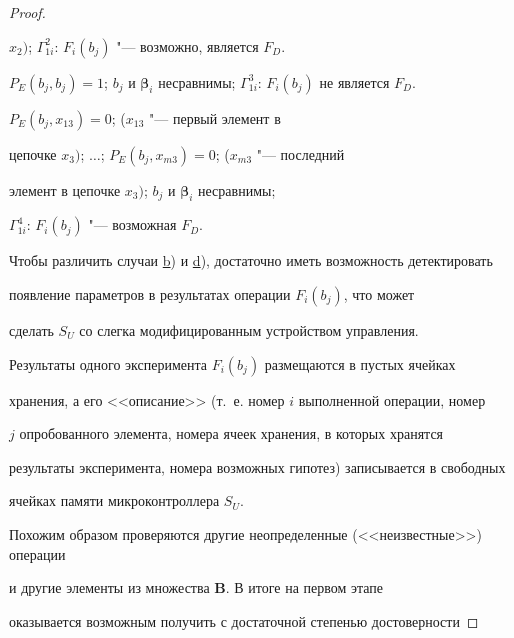 \begin{proof}
\begin{description}
$x_{2})$; $\Gamma ^{2}_{1i}$: $F_{i}(b_{j})$ "--- возможно, является $F_{D}$.



\item[Для случая \hyperlink{kr:c}{c}):] $P_{E}(b_{j}, b_{j}) = 1$; $b_{j}$ и $\boldsymbol{\beta}

_{i}$ несравнимы; $\Gamma ^{3}_{1i}$: $F_{i}(b_{j})$ не является $F_{D}$.



\item[Для случая \hyperlink{kr:d}{d}):] $P_{E}(b_{j}, x_{13}) = 0$; ($x_{13}$ "--- первый элемент в

цепочке $x_{3})$; $\ldots$; \linebreak $P_{E}(b_{j}, x_{m3})=0$; ($x_{m3}$ "--- последний

элемент в цепочке $x_{3})$; $b_{j}$ и $\boldsymbol{\beta}_{i}$ несравнимы;

$\Gamma ^{4}_{1i}$: $F_{i}(b_{j})$ "--- возможная $F_{D}$.







\end{description}



Чтобы различить случаи \hyperlink{kr:b}{b}) и \hyperlink{kr:d}{d}), достаточно иметь возможность детектировать

появление параметров в результатах операции $F_{i}(b_{j})$, что может

сделать $S_{U}$ со слегка модифицированным устройством управления.



Результаты одного эксперимента $F_{i}(b_{j})$ размещаются в пустых ячейках

хранения, а его <<описание>> (т.~е. номер $i$ выполненной операции, номер

$j$ опробованного элемента, номера ячеек хранения, в которых хранятся

результаты эксперимента, номера возможных гипотез) записывается в свободных

ячейках памяти микроконтроллера $S_{U}$.



Похожим образом проверяются другие неопределенные (<<неизвестные>>) операции

и другие элементы из множества $\mathbf{B}$. В итоге на первом этапе

оказывается возможным получить с достаточной степенью достоверности


\end{proof}
